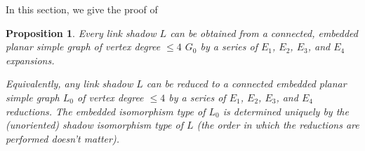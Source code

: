 \documentclass[amsmath,secnumarabic,floatfix,amssymb,nofootinbib,nobibnotes,letterpaper,11pt,tightenlines,showkeys]{revtex4}
\newtheorem{proposition}[theorem]{Proposition}
\theoremstyle{definition}
\newcommand{\loopinsert}{E_1}
\newcommand{\edgedouble}{E_2}
\newcommand{\cutedgedouble}{E_3}
\newcommand{\pairinsert}{E_4}
\begin{document}
In this section, we give the proof of

\setcounter{theorem}{16}

\begin{proposition}
Every link shadow $L$ can be obtained from a connected, embedded planar simple graph of vertex degree $\leq 4$ $G_0$ by a series of $\loopinsert$, $\edgedouble$, $\cutedgedouble$, and $\pairinsert$ expansions.

Equivalently, any link shadow $L$ can be reduced to a connected embedded planar simple graph $L_0$ of vertex degree $\leq 4$ by a series of $\loopinsert$, $\edgedouble$, $\cutedgedouble$, and $\pairinsert$ reductions. The embedded isomorphism type of $L_0$ is determined uniquely by the (unoriented) shadow isomorphism type of $L$ (the order in which the reductions are performed doesn't matter).
\end{proposition}
\end{document}

